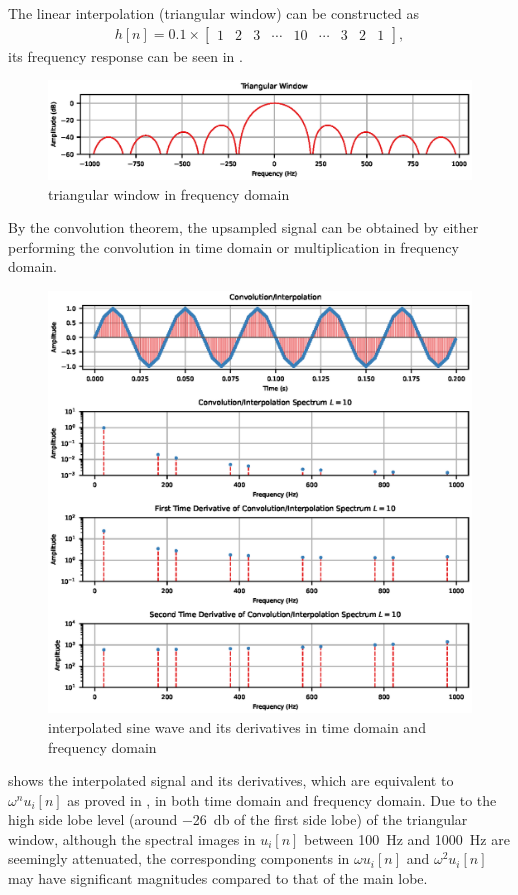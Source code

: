 The linear interpolation (triangular window) can be constructed as
\begin{gather}
h[n]=0.1\times\begin{bmatrix}
1&2&3&\cdots&10&\cdots&3&2&1
\end{bmatrix},
\end{gather}
its frequency response can be seen in .
\begin{figure}[H]
\centering
\includegraphics{PIC/TriangularWindow}
\caption{triangular window in frequency domain}\label{fig:tri_window}
\end{figure}

By the convolution theorem, the upsampled signal can be obtained by either performing the convolution in time domain or multiplication in frequency domain.
\begin{figure}[H]
\centering
\includegraphics{PIC/Convolution}
\caption{interpolated sine wave and its derivatives in time domain and frequency domain}\label{fig:interpolated}
\end{figure}
 shows the interpolated signal and its derivatives, which are equivalent to $\omega^nu_i[n]$ as proved in , in both time domain and frequency domain. Due to the high side lobe level (around \SI{-26}{\decibel} of the first side lobe) of the triangular window, although the spectral images in $u_i[n]$ between \SI{100}{\hertz} and \SI{1000}{\hertz} are seemingly attenuated, the corresponding components in $\omega{}u_i[n]$ and $\omega^2u_i[n]$ may have significant magnitudes compared to that of the main lobe.

